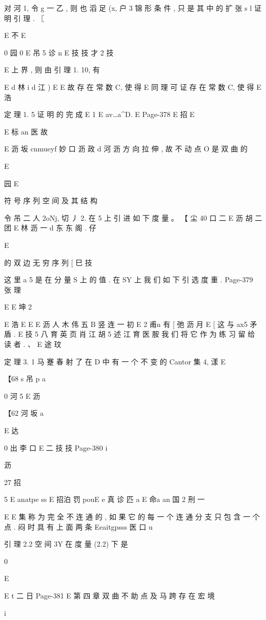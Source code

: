 {{{{{{{{{{{{{{{对 河 1, 令 g 一 乙 , 则 也 滔 足 (x, 户 3 锦 形 条 件 , 只 是 其 中 的 扩 张
s l
证 明 引 理 . 〖

E 不
E

0 园 0
E 吊 5 诊
n
E 技 技 才 2 技

E
上 界 , 则 由 引 理 1. 10, 有

E d 林 i
d
江 )
E
E
故 存 在 常 数 C, 使 得
E
同 理 可 证 存 在 常 数 C, 使 得
E 浩

定 理 1. 5 证 明 的 完 成
E
1
E av…a^D.
E
Page-378
E 招 E

E 标 an
医 故

E 沥 坂 cnmueyf 妙 口 沥 政 d 河 沥
方 向 拉 伸 , 故 不 动 点 O 是 双 曲 的

E

园
E

符 号 序 列 空 间 及 其 结 构

令
吊 二 人 2oNj, 切 丿 2.
在 5 上 引 进 如 下 度 量 。
【 尘
40 口 二 E 沥 胡 二 团
E 林 沥 一 d 东 东
阁 . 仔

E

的 双 边 无 穷 序 列
[
巳
技

这 里 a 5 是 在 分 量 S 上 的 值 . 在 SY 上 我 们 如 下 引 选 度 重 .
Page-379
张 理

E
E 坤 2

E 浩
E
E
E 沥 人 木 伟 五
B 竖 连 一 初
E 2 甫n 有
[ 弛 沥 月
E
[
这 与 ax5 矛 盾 .
E 技 5 八 育 英 页 肖 江 胡 5 述 江 育
医 胺
我 们 将 它 作 为 练 习 留 给 读 者 . 、
E 途
玟

定 理 3. 1 马 蹇 春 射 了 在 D 中 有 一 个 不 变 的 Cantor 集 4, 漾
E

【68 s 吊 p a

0 河 5
E 沥

【62 河 坂 a

E 达

0 出 李 口
E 二 技 技
Page-380
i

沥

27 招

5
E anatpe ss
E 招泊 罚
pouE e 真 诊
匹 a
E 命a an 国 2 刑 一

E
E 集 称 为 完 全 不 连
通 的 , 如 果 它 的 每 一 个 连 通 分 支 只 包 含 一 个 点 . 闷 时 具 有 上 面 两 条
Eeaitgpsss 医 口 u

引 理 2.2 空 间 3Y 在 度 量 (2.2) 下 是

0

E

E t 二 日
Page-381
E 第 四 章 双 曲 不 助 点 及 马 跨 存 在 宏 境

i

}}}}}}}}}}}}}}}
